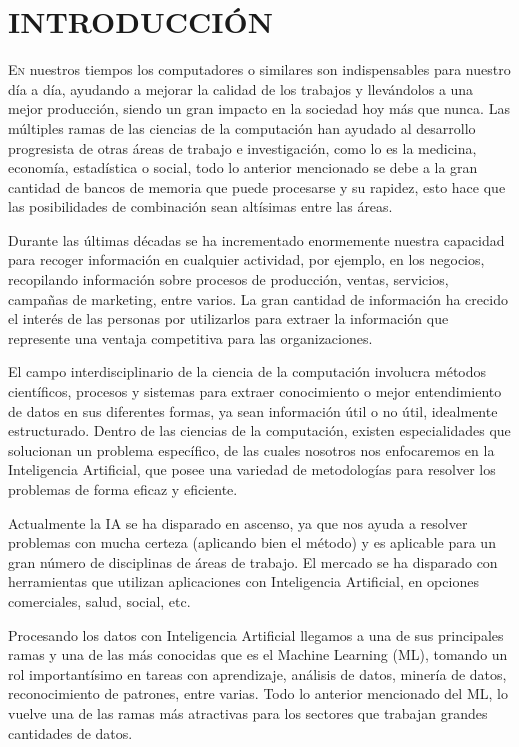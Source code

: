 \doublespacing
\chapter{INTRODUCCIÓN}
\lettrine[lines=4, slope=0.1em, findent=0.2em, nindent=0.6em]{E}{n} nuestros tiempos los computadores o similares son indispensables para nuestro día a día, ayudando a mejorar la calidad de los trabajos y llevándolos a una mejor producción, siendo un gran impacto en la sociedad hoy más que nunca. Las múltiples ramas de las ciencias de la computación han ayudado al desarrollo progresista de otras áreas de trabajo e investigación, como lo es la medicina, economía, estadística o social, todo lo anterior mencionado se debe a la gran cantidad de bancos de memoria que puede procesarse y su rapidez, esto hace que las posibilidades de combinación sean altísimas entre las áreas.\\
\par Durante las últimas décadas se ha incrementado enormemente nuestra capacidad para recoger información en cualquier actividad, por ejemplo, en los negocios, recopilando información sobre procesos de producción, ventas, servicios, campañas de marketing, entre varios. La gran cantidad de información ha crecido el interés de las personas por utilizarlos para extraer la información que represente una ventaja competitiva para las organizaciones.\\ 
\par El campo interdisciplinario de la ciencia de la computación involucra métodos científicos, procesos y sistemas para extraer conocimiento o mejor entendimiento de datos en sus diferentes formas, ya sean información útil o no útil, idealmente estructurado. Dentro de las ciencias de la computación, existen especialidades que solucionan un problema específico, de las cuales nosotros nos enfocaremos en la Inteligencia Artificial, que posee una variedad de metodologías para resolver los problemas de forma eficaz y eficiente. \\
\par Actualmente la IA se ha disparado en ascenso, ya que nos ayuda a resolver problemas con mucha certeza (aplicando bien el método) y es aplicable para un gran número de disciplinas de áreas de trabajo. El mercado se ha disparado con herramientas que utilizan aplicaciones con Inteligencia Artificial, en opciones comerciales, salud, social, etc.\\
\par Procesando los datos con Inteligencia Artificial llegamos a una de sus principales ramas y una de las más conocidas que es el Machine Learning (ML), tomando un rol importantísimo en tareas con aprendizaje, análisis de datos, minería de datos, reconocimiento de patrones, entre varias. Todo lo anterior mencionado del ML, lo vuelve una de las ramas más atractivas para los sectores que trabajan grandes cantidades de datos.\\
